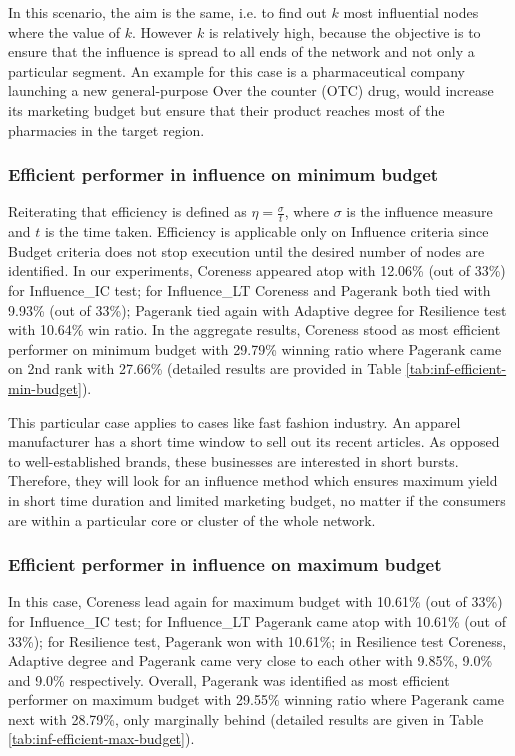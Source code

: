 		In this scenario, the aim is the same, i.e. to find out $k$ most influential nodes where the value of $k$. However $k$ is relatively high, because the objective is to ensure that the influence is spread to all ends of the network and not only a particular segment. An example for this case is a pharmaceutical company launching a new general-purpose Over the counter (OTC) drug, would increase its marketing budget but ensure that their product reaches most of the pharmacies in the target region.
	
		\subsubsection{Efficient performer in influence on minimum budget}
		Reiterating that efficiency is defined as $\eta=\frac{\sigma}{t}$, where $\sigma$ is the influence measure and $t$ is the time taken. Efficiency is applicable only on Influence criteria since Budget criteria does not stop execution until the desired number of nodes are identified. In our experiments, Coreness appeared atop with 12.06\% (out of 33\%) for Influence\_IC test; for Influence\_LT Coreness and Pagerank both tied with 9.93\% (out of 33\%); Pagerank tied again with Adaptive degree for Resilience test with 10.64\% win ratio. In the aggregate results, Coreness stood as most efficient performer on minimum budget with 29.79\% winning ratio where Pagerank came on 2nd rank with 27.66\% (detailed results are provided in Table \ref{tab:inf-efficient-min-budget}).
		
		This particular case applies to cases like fast fashion industry. An apparel manufacturer has a short time window to sell out its recent articles. As opposed to well-established brands, these businesses are interested in short bursts. Therefore, they will look for an influence method which ensures maximum yield in short time duration and limited marketing budget, no matter if the consumers are within a particular core or cluster of the whole network.
	
		\subsubsection{Efficient performer in influence on maximum budget}
		In this case, Coreness lead again for maximum budget with 10.61\% (out of 33\%) for Influence\_IC test; for Influence\_LT Pagerank came atop with 10.61\% (out of 33\%); for Resilience test, Pagerank won with 10.61\%; in Resilience test Coreness, Adaptive degree and Pagerank came very close to each other with 9.85\%, 9.0\% and 9.0\% respectively. Overall, Pagerank was identified as most efficient performer on maximum budget with 29.55\% winning ratio where Pagerank came next with 28.79\%, only marginally behind (detailed results are given in Table \ref{tab:inf-efficient-max-budget}).
		
